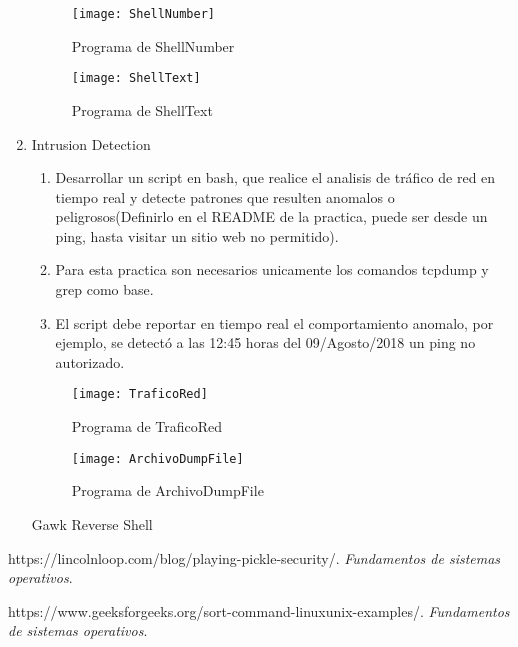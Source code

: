 \documentclass[a4paperx]{article}
\begin{document}
\begin{enumerate}
\begin{figure}[H]
\centering
\texttt{[image: ShellNumber]}
\caption{Programa de ShellNumber}
\end{figure}

\begin{figure}[H]
\centering
\texttt{[image: ShellText]}
\caption{Programa de ShellText}
\end{figure}



\item{Intrusion Detection}\\

\begin{enumerate}

\item{Desarrollar un script en bash, que realice el analisis de tr\'afico de red en tiempo real y detecte patrones que resulten anomalos o peligrosos(Definirlo en el README de la practica, puede ser desde un ping, hasta visitar un sitio web no permitido).}\\

\item{Para esta practica son necesarios unicamente los comandos tcpdump y grep como base.}\\

\item{El script debe reportar en tiempo real el comportamiento anomalo, por ejemplo, se detect\'o a las 12:45 horas del 09/Agosto/2018 un ping no autorizado.}\\

\end{enumerate}

\begin{figure}[H]
\centering
\texttt{[image: TraficoRed]}
\caption{Programa de TraficoRed}
\end{figure}

\begin{figure}[H]
\centering
\texttt{[image: ArchivoDumpFile]}
\caption{Programa de ArchivoDumpFile}
\end{figure}


Gawk Reverse Shell
\end{enumerate}



\begin{thebibliography}{99}

  https://lincolnloop.com/blog/playing-pickle-security/. {\it Fundamentos de sistemas operativos}. 

  https://www.geeksforgeeks.org/sort-command-linuxunix-examples/. {\it Fundamentos de sistemas operativos}. 

\end{thebibliography}

\
\end{document}
